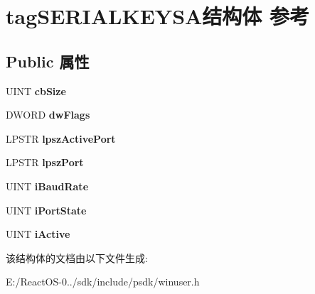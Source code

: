 \hypertarget{structtag_s_e_r_i_a_l_k_e_y_s_a}{}\section{tag\+S\+E\+R\+I\+A\+L\+K\+E\+Y\+S\+A结构体 参考}
\label{structtag_s_e_r_i_a_l_k_e_y_s_a}
\subsection*{Public 属性}
\begin{DoxyCompactItemize}
\item 
\mbox{\label{structtag_s_e_r_i_a_l_k_e_y_s_a_a352d2b1a03872b0731a251cfda3fd589}} 
U\+I\+NT {\bfseries cb\+Size}
\item 
\mbox{\label{structtag_s_e_r_i_a_l_k_e_y_s_a_aac4d1bba6bce8010f90038ede5d4ee43}} 
D\+W\+O\+RD {\bfseries dw\+Flags}
\item 
\mbox{\label{structtag_s_e_r_i_a_l_k_e_y_s_a_aed5367f2660a59e17b7168c030042882}} 
L\+P\+S\+TR {\bfseries lpsz\+Active\+Port}
\item 
\mbox{\label{structtag_s_e_r_i_a_l_k_e_y_s_a_a5869ad7edf0f60ea64a7b4c12f2dda5d}} 
L\+P\+S\+TR {\bfseries lpsz\+Port}
\item 
\mbox{\label{structtag_s_e_r_i_a_l_k_e_y_s_a_a2c4828692334ea06a07e6c8472d6b6c6}} 
U\+I\+NT {\bfseries i\+Baud\+Rate}
\item 
\mbox{\label{structtag_s_e_r_i_a_l_k_e_y_s_a_a05cded5dcd732578a4d3cf0c15dd8019}} 
U\+I\+NT {\bfseries i\+Port\+State}
\item 
\mbox{\label{structtag_s_e_r_i_a_l_k_e_y_s_a_ace3dadadb29996321e881dd182f55da8}} 
U\+I\+NT {\bfseries i\+Active}
\end{DoxyCompactItemize}


该结构体的文档由以下文件生成\+:\begin{DoxyCompactItemize}
\item 
E\+:/\+React\+O\+S-\/0../sdk/include/psdk/winuser.\+h\end{DoxyCompactItemize}
